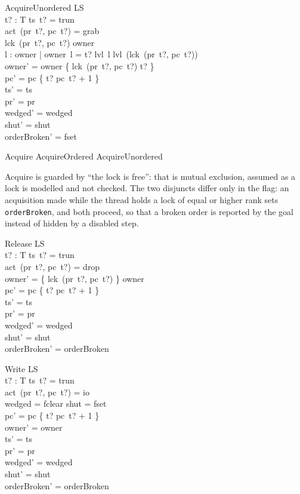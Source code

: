 \documentclass[a4paper,10pt,fleqn]{article}
\begin{document}
\begin{schema}{AcquireUnordered}
  \Delta LS \\
  t? : T
\where
  ts~t? = trun \\
  act~(pr~t?, pc~t?) = grab \\
  lck~(pr~t?, pc~t?) \notin \dom owner \\
  \exists l : \dom owner | owner~l = t? \spot
    lvl~l \geq lvl~(lck~(pr~t?, pc~t?)) \\
  owner' = owner \cup \{ lck~(pr~t?, pc~t?) \mapsto t? \} \\
  pc' = pc \oplus \{ t? \mapsto pc~t? + 1 \} \\
  ts' = ts \\
  pr' = pr \\
  wedged' = wedged \\
  shut' = shut \\
  orderBroken' = fset
\end{schema}

\begin{zed}
  Acquire  AcquireOrdered \lor AcquireUnordered
\end{zed}

Acquire is guarded by ``the lock is free'': that is mutual exclusion, assumed
as a lock is modelled and not checked.  The two disjuncts differ only in the
flag: an acquisition made while the thread holds a lock of equal or higher
rank sets \texttt{orderBroken}, and both proceed, so that a broken order is
reported by the goal instead of hidden by a disabled step.

\begin{schema}{Release}
  \Delta LS \\
  t? : T
\where
  ts~t? = trun \\
  act~(pr~t?, pc~t?) = drop \\
  owner' = \{ lck~(pr~t?, pc~t?) \} \ndres owner \\
  pc' = pc \oplus \{ t? \mapsto pc~t? + 1 \} \\
  ts' = ts \\
  pr' = pr \\
  wedged' = wedged \\
  shut' = shut \\
  orderBroken' = orderBroken
\end{schema}

\begin{schema}{Write}
  \Delta LS \\
  t? : T
\where
  ts~t? = trun \\
  act~(pr~t?, pc~t?) = io \\
  wedged = fclear \lor shut = fset \\
  pc' = pc \oplus \{ t? \mapsto pc~t? + 1 \} \\
  owner' = owner \\
  ts' = ts \\
  pr' = pr \\
  wedged' = wedged \\
  shut' = shut \\
  orderBroken' = orderBroken
\end{schema}
\end{document}
